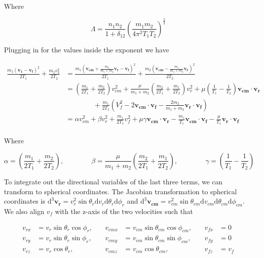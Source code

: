 \documentclass[11pt]{article}
\begin{document}
Where

\begin{equation}
	\Lambda = \frac{n_1 n_2}{1 + \delta_{12}} \left( \frac{m_1 m_2}{4 \pi^2 T_1 T_2} \right)^{\frac{3}{2}} 
\end{equation}

Plugging in for the values inside the exponent we have

\begin{align*}
	\frac{m_1 (\mathbf{v_1} - \mathbf{v_f})^2}{2 T_1} + \frac{m_2 v_2^2}{2 T_2} &= \frac{m_1 \left( \mathbf{v_{cm}} + \frac{m_2}{m_1 + m_2} \mathbf{v_r} - \mathbf{v_f} \right)^2 }{2 T_1} + \frac{m_2 \left( \mathbf{v_{cm}} - \frac{m_1}{m_1 + m_2} \mathbf{v_r} \right)^2 }{2 T_2} \\
	&= \left( \frac{m_1}{2 T_1} + \frac{m_2}{2 T_2} \right) v_{cm}^2 + \frac{\mu}{m_1 + m_2} \left( \frac{m_2}{2 T_1} + \frac{m_1}{2 T_2} \right)  v_r^2 + \mu \left( \frac{1}{T_1} - \frac{1}{T_2} \right) \mathbf{v_{cm}} \cdot \mathbf{v_r} \\
	& \qquad \qquad + \frac{m_1}{2 T_1} \left( V_f^2 - 2 \mathbf{v_{cm}} \cdot \mathbf{v_f} - \frac{2 m_2}{m_1 + m_2} \mathbf{v_r} \cdot \mathbf{v_f} \right) \\
	&= \alpha v_{cm}^2 + \beta  v_r^2 + \frac{m_1}{2 T_1} v_f^2 + \mu \gamma \mathbf{v_{cm}} \cdot \mathbf{v_r} - \frac{m_1}{T_1} \mathbf{v_{cm}} \cdot \mathbf{v_f} - \frac{\mu}{T_1} \mathbf{v_r} \cdot \mathbf{v_f} \\
\end{align*}

Where

\begin{equation}
	\alpha = \left( \frac{m_1}{2 T_1} + \frac{m_2}{2 T_2} \right), \qquad \qquad \beta = \frac{\mu}{m_1 + m_2} \left( \frac{m_2}{2 T_1} + \frac{m_1}{2 T_2} \right), \qquad \qquad \gamma = \left( \frac{1}{T_1} - \frac{1}{T_2} \right)
\end{equation}

To integrate out the directional variables of the last three terms, we can transform to spherical coordinates. The Jacobian transformation to spherical coordinates is $\mathrm{d}^3 \mathbf{v_r} = v_r^2 \sin \theta_r \mathrm{d} v_r \mathrm{d} \theta_r \mathrm{d} \phi_r$ and $\mathrm{d}^3 \mathbf{v_{cm}} = v_{cm}^2 \sin \theta_{cm} \mathrm{d} v_{cm} \mathrm{d} \theta_{cm} \mathrm{d} \phi_{cm}$. We also align $v_f$ with the z-axis of the two velocities such that

\begin{align*}
	v_{rx} &= v_r \sin \theta_r \cos \phi_r, \quad &v_{cmx} &= v_{cm} \sin \theta_{cm} \cos \phi_{cm}, \quad &v_{fx} &= 0 \\
	v_{ry} &= v_r \sin \theta_r \sin \phi_r, \quad &v_{cmy} &= v_{cm} \sin \theta_{cm} \sin \phi_{cm}, \quad &v_{fy} &= 0 \\
	v_{rz} &= v_r \cos \theta_r, \quad &v_{cmz} &= v_{cm} \cos \theta_{cm}, \quad &v_{fz} &= v_f
\end{align*}
\end{document}
